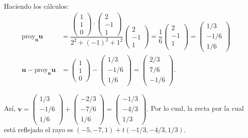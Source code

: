\begin{prob}
\begin{myproof}
Haciendo los cálculos: 
\begin{align*}
\text{proy}_{\mathbf{n}}\mathbf{u}&=\dfrac{\begin{pmatrix}
1\\1\\0
\end{pmatrix}\cdot \begin{pmatrix}
2\\-1\\1
\end{pmatrix}}{2^2+(-1)^2+1^2}\begin{pmatrix}
2\\-1\\1
\end{pmatrix}
=\dfrac{1}{6}\begin{pmatrix}2\\-1\\1\\\end{pmatrix}=\begin{pmatrix}1/3\\-1/6\\1/6 \end{pmatrix}\\
\mathbf{u}-\text{proy}_{\mathbf{n}}\mathbf{u}&=\begin{pmatrix}
1\\1\\0
\end{pmatrix}-\begin{pmatrix}
1/3\\-1/6\\1/6
\end{pmatrix}=\begin{pmatrix}
2/3\\7/6\\-1/6
\end{pmatrix}.
\end{align*}

Así, $\mathbf{v}=\begin{pmatrix} 1/3\\-1/6\\1/6 \end{pmatrix} + \begin{pmatrix}
-2/3\\-7/6\\1/6
\end{pmatrix}=\begin{pmatrix} -1/3\\-4/3\\1/3 \end{pmatrix}.$
Por lo cual, la recta por la cual está reflejado el rayo es $\boxed{(-5,-7,1)+t(-1/3,-4/3,1/3).}$
\end{myproof}
\end{prob}

